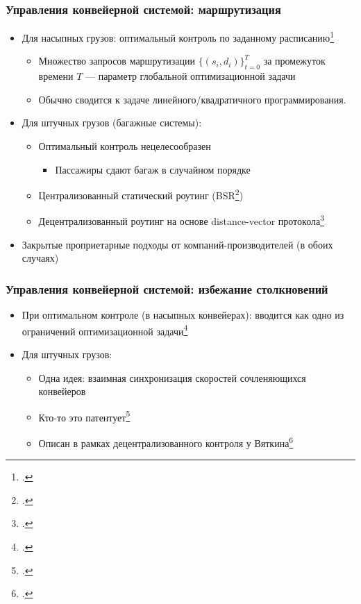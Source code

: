 \documentclass{beamer}
\begin{document}
\begin{frame}
  \frametitle{Управления конвейерной системой: маршрутизация}
  \begin{itemize}
  \item Для насыпных грузов: оптимальный контроль по заданному расписанию\footcite{ago2007simultaneous}
    \begin{itemize}
    \item Множество запросов маршрутизации $\{(s_i, d_i)\}_{t=0}^T$ за промежуток времени $T$ --- параметр глобальной оптимизационной задачи
    \item Обычно сводится к задаче линейного/квадратичного программирования.
    \end{itemize} 
  \item Для штучных грузов (багажные системы):
    \begin{itemize}
    \item Оптимальный контроль нецелесообразен
      \begin{itemize}
      \item Пассажиры сдают багаж в случайном порядке
      \end{itemize} 
    \item Централизованный статический роутинг (BSR\footcite{johnstone2009status})
    \item Децентрализованный роутинг на основе distance-vector протокола\footcite{black2009intelligent}
    \end{itemize} 
  \item Закрытые проприетарные подходы от компаний-производителей (в обоих случаях)
  \end{itemize}
\end{frame}

\begin{frame}
  \frametitle{Управления конвейерной системой: избежание столкновений}
  \begin{itemize}
  \item При оптимальном контроле (в насыпных конвейерах): вводится как одно из ограничений оптимизационной задачи\footcite{ago2007simultaneous}
  \item Для штучных грузов:
    \begin{itemize}
    \item Одна идея: взаимная синхронизация скоростей сочленяющихся конвейеров
    \item Кто-то это патентует\footcite{schafer2011material}
    \item Описан в рамках децентрализованного контроля у Вяткина\footcite{black2009intelligent}
    \end{itemize}
  \end{itemize}
\end{frame}
\end{document}
